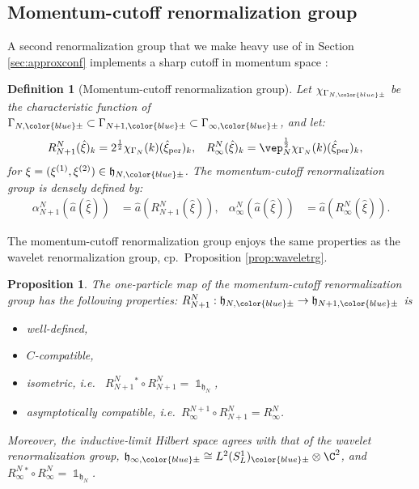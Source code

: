 \documentclass[a4paper, 11pt]{article}
\newcommand{\fh}{\mathfrak{h}}
\DeclareMathOperator{\1}{\mathds{1}}
\DeclareMathOperator{\per}{per}
\newtheorem{prop}[thm]{Proposition}
\newtheorem{defn}[thm]{Definition}
\providecommand{\DIFaddend}{} %
\DeclareRobustCommand{\DIFaddend}{\DIFOaddend \let\includegraphics\DIFOincludegraphics} %
\begin{document}
\DIFaddend \subsection{Momentum-cutoff renormalization group}
\label{sec:momcut}
A second renormalization group that we make heavy use of in Section \ref{sec:approxconf} implements a sharp cutoff in momentum space \cite{MorinelliScalingLimitsOf}: 
\begin{defn}[Momentum-cutoff renormalization group]
\label{def:momrg}
Let $\chi_{\Gamma_{N,{\color{blue}\pm}}}$ be the characteristic function of $\Gamma_{N,{\color{blue}\pm}}\subset\Gamma_{N+1,{\color{blue}\pm}}\subset\Gamma_{\infty,{\color{blue}\pm}}$, and let:
\begin{align}
\label{eq:momrg1p}
R^{N}_{N+1}(\hat{\xi})_{k} & = 2^{\frac{1}{2}}\chi_{\Gamma_{N}}(k)(\hat{\xi}_{\per})_{k}, & R^{N}_{\infty}(\hat{\xi})_{k} & = \vep_{N}^{\frac{1}{2}}\chi_{\Gamma_{N}}(k)(\hat{\xi}_{\per})_{k},
\end{align}
for $\xi=(\xi^{(1)},\xi^{(2)})\in\fh_{N,{\color{blue}\pm}}$. The \emph{momentum-cutoff renormalization group} is densely defined by:
\begin{align}
\label{eq:momrg}
\alpha^{N}_{N+1}(\hat{a}(\hat{\xi})) & = \hat{a}(R^{N}_{N+1}(\hat{\xi})), & \alpha^{N}_{\infty}(\hat{a}(\hat{\xi})) & = \hat{a}(R^{N}_{\infty}(\hat{\xi})).
\end{align}
\end{defn}
The momentum-cutoff renormalization group enjoys the same properties as the wavelet renormalization group, cp.~Proposition \ref{prop:waveletrg}.
\begin{prop}
\label{prop:momrg}
The one-particle map of the momentum-cutoff renormalization group has the following properties: $R^{N}_{N+1}:\fh_{N,{\color{blue}\pm}}\rightarrow\fh_{N+1,{\color{blue}\pm}}$ is
\begin{itemize}
	\item[1.] well-defined,
	\item[2.] $C$-compatible,
	\item[3.] isometric, i.e.~ $R^{N}_{N+1}{}^{\!\!*}\circ R^{N}_{N+1} = \1_{\fh_{N}}$, 
	\item[4.] asymptotically compatible, i.e.~$R^{N+1}_{\infty}\circ R^{N}_{N+1} = R^{N}_{\infty}$.
\end{itemize}
Moreover, the inductive-limit Hilbert space agrees with that of the wavelet renormalization group, $\fh_{\infty,{\color{blue}\pm}}\cong L^{2}(S^{1}_{L})_{{\color{blue}\pm}}\otimes\C^{2}$, and $R^{N}_{\infty}{}^{*}\circ R^{N}_{\infty} = \1_{\fh_{N}}$.
\end{prop}
\end{document}
